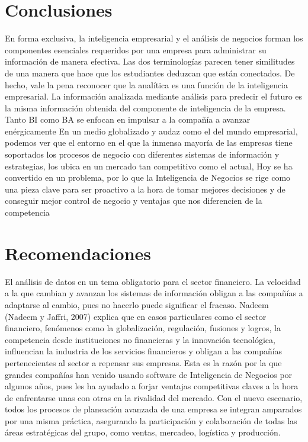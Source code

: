 \documentclass[twoside,twocolumn]{article}
\begin{document}
\section{Conclusiones}
En forma exclusiva, la inteligencia empresarial y el análisis de negocios forman los componentes esenciales requeridos por una empresa para administrar su información de manera efectiva. Las dos terminologías parecen tener similitudes de una manera que hace que los estudiantes deduzcan que están conectados. De hecho, vale la pena reconocer que la analítica es una función de la inteligencia empresarial. La información analizada mediante análisis para predecir el futuro es la misma información obtenida del componente de inteligencia de la empresa. Tanto BI como BA se enfocan en impulsar a la compañía a avanzar enérgicamente En un medio globalizado y audaz como el del mundo empresarial, podemos ver que el entorno en el que la inmensa mayoría de las empresas tiene soportados los procesos de negocio con diferentes sistemas de información y estrategias, los ubica en un mercado tan competitivo como el actual, Hoy se ha convertido en un problema, por lo que la Inteligencia de Negocios se rige como una pieza clave para ser proactivo a la hora de tomar mejores decisiones y de conseguir mejor control de negocio y ventajas que nos diferencien de la competencia



\section{Recomendaciones}
El análisis de datos en un tema obligatorio para el sector financiero. La velocidad a la que cambian y avanzan los sistemas de información obligan a las compañías a adaptarse al cambio, pues no hacerlo puede significar el fracaso. 
Nadeem (Nadeem y Jaffri, 2007) explica que en casos particulares como el sector financiero, fenómenos como la globalización, regulación, fusiones y logros, la competencia desde instituciones no financieras y la innovación tecnológica, influencian la industria de los servicios financieros y obligan a las compañías pertenecientes al sector a repensar sus empresas. Esta es la razón por la que grandes compañías han venido usando software de Inteligencia de Negocios por algunos años, pues les ha ayudado a forjar ventajas competitivas claves a la hora de enfrentarse unas con otras en la rivalidad del mercado.
Con el nuevo escenario, todos los procesos de planeación avanzada de una empresa se integran amparados por una misma práctica, asegurando la participación y colaboración de todas las áreas estratégicas del grupo, como ventas, mercadeo, logística y producción.
 
\end{document}
